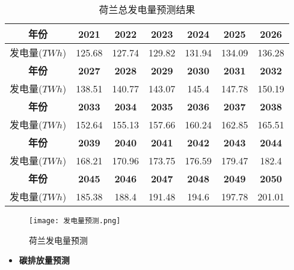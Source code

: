 \documentclass[bwprint]{gmcmthesis}
\numberwithin{figure}{section}
\begin{document}
	\begin{table}[]
		\centering
		\begin{tabular}{|c|c|c|c|c|c|c|}
		\hline
		\textbf{年份} & \textbf{2021} & \textbf{2022} & \textbf{2023} & \textbf{2024} & \textbf{2025} & \textbf{2026} \\ \hline
		发电量($TWh$) & 125.68        & 127.74        & 129.82        & 131.94        & 134.09        & 136.28        \\ \hline
		\textbf{年份} &\textbf{2027} & \textbf{2028} & \textbf{2029} & \textbf{2030} & \textbf{2031} & \textbf{2032} \\ \hline
		发电量($TWh$) &138.51        & 140.77        & 143.07        & 145.4         & 147.78        & 150.19        \\ \hline
		\textbf{年份} &\textbf{2033} & \textbf{2034} & \textbf{2035} & \textbf{2036} & \textbf{2037} & \textbf{2038} \\ \hline
		发电量($TWh$) &152.64        & 155.13        & 157.66        & 160.24        & 162.85        & 165.51        \\ \hline
		\textbf{年份} &\textbf{2039} & \textbf{2040} & \textbf{2041} & \textbf{2042} & \textbf{2043} & \textbf{2044} \\ \hline
		发电量($TWh$) &168.21        & 170.96        & 173.75        & 176.59        & 179.47        & 182.4         \\ \hline
		\textbf{年份} &\textbf{2045} & \textbf{2046} & \textbf{2047} & \textbf{2048} & \textbf{2049} & \textbf{2050} \\ \hline
		发电量($TWh$) &185.38        & 188.4         & 191.48        & 194.6         & 197.78        & 201.01        \\ \hline
		\end{tabular}
		\caption{荷兰总发电量预测结果}
	\label{table_1}
		\end{table}

		\begin{figure}[!h]
			\centering
			\texttt{[image: 发电量预测.png]}
			\caption{荷兰发电量预测}
			\label{fig_3}
		\end{figure}

\begin{itemize}
	\item \textbf{碳排放量预测}
\end{itemize}
\end{document}
